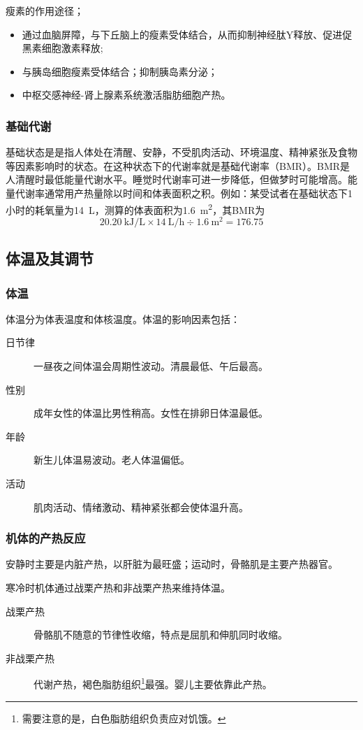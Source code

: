 瘦素的作用途径；
\begin{itemize}
	\item 通过血脑屏障，与下丘脑上的瘦素受体结合，从而抑制神经肽Y释放、促进促黑素细胞激素释放;
	\item 与胰岛细胞瘦素受体结合；抑制胰岛素分泌；
	\item 中枢交感神经-肾上腺素系统激活脂肪细胞产热。
\end{itemize}

\subsubsection{基础代谢}

基础状态是是指人体处在清醒、安静，不受肌肉活动、环境温度、精神紧张及食物等因素影响时的状态。在这种状态下的代谢率就是基础代谢率（BMR）。BMR是人清醒时最低能量代谢水平。睡觉时代谢率可进一步降低，但做梦时可能增高。能量代谢率通常用产热量除以时间和体表面积之积。例如：某受试者在基础状态下1小时的耗氧量为\SI{14}{\L}，测算的体表面积为\SI{1.6}{\square\m}，其BMR为\[\SI{20.20}{\kJ\per\L}\times\SI{14}{\L\per\hour}\div\SI{1.6}{\square\m}=176.75\]

\subsection{体温及其调节}

\subsubsection{体温}

体温分为体表温度和体核温度。体温的影响因素包括：
\begin{description}
	\item[日节律] 一昼夜之间体温会周期性波动。清晨最低、午后最高。
	\item[性别] 成年女性的体温比男性稍高。女性在排卵日体温最低。
	\item[年龄] 新生儿体温易波动。老人体温偏低。
	\item[活动] 肌肉活动、情绪激动、精神紧张都会使体温升高。
\end{description}

\subsubsection{机体的产热反应}

安静时主要是内脏产热，以肝脏为最旺盛；运动时，骨骼肌是主要产热器官。

寒冷时机体通过战栗产热和非战栗产热来维持体温。
\begin{description}
	\item[战栗产热] 骨骼肌不随意的节律性收缩，特点是屈肌和伸肌同时收缩。
	\item[非战栗产热] 代谢产热，褐色脂肪组织\footnote{需要注意的是，白色脂肪组织负责应对饥饿。}最强。婴儿主要依靠此产热。
\end{description}

